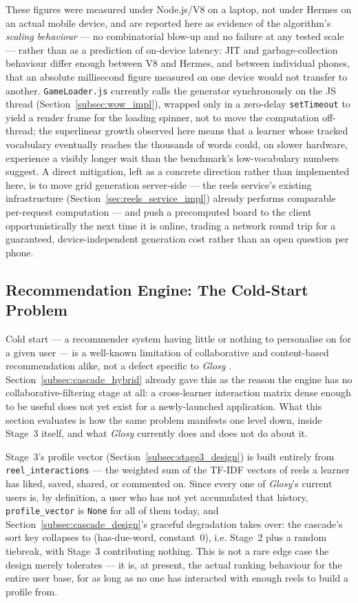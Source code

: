     These figures were measured under Node.js/V8 on a laptop, not under Hermes on an actual mobile device, and are reported here as evidence of the algorithm's \emph{scaling behaviour} --- no combinatorial blow-up and no failure at any tested scale --- rather than as a prediction of on-device latency: JIT and garbage-collection behaviour differ enough between V8 and Hermes, and between individual phones, that an absolute millisecond figure measured on one device would not transfer to another. \texttt{GameLoader.js} currently calls the generator synchronously on the JS thread (Section~\ref{subsec:wow_impl}), wrapped only in a zero-delay \texttt{setTimeout} to yield a render frame for the loading spinner, not to move the computation off-thread; the superlinear growth observed here means that a learner whose tracked vocabulary eventually reaches the thousands of words could, on slower hardware, experience a visibly longer wait than the benchmark's low-vocabulary numbers suggest. A direct mitigation, left as a concrete direction rather than implemented here, is to move grid generation server-side --- the reels service's existing infrastructure (Section~\ref{sec:reels_service_impl}) already performs comparable per-request computation --- and push a precomputed board to the client opportunistically the next time it is online, trading a network round trip for a guaranteed, device-independent generation cost rather than an open question per phone.

    \subsection{Recommendation Engine: The Cold-Start Problem}
    \label{subsec:recommender_cold_start}
    Cold start --- a recommender system having little or nothing to personalise on for a given user --- is a well-known limitation of collaborative and content-based recommendation alike, not a defect specific to \textit{Glosy} \cite{adomavicius2005toward}. Section~\ref{subsec:cascade_hybrid} already gave this as the reason the engine has no collaborative-filtering stage at all: a cross-learner interaction matrix dense enough to be useful does not yet exist for a newly-launched application. What this section evaluates is how the same problem manifests one level down, inside Stage~3 itself, and what \textit{Glosy} currently does and does not do about it.

    Stage~3's profile vector (Section~\ref{subsec:stage3_design}) is built entirely from \texttt{reel\_interactions} --- the weighted sum of the TF-IDF vectors of reels a learner has liked, saved, shared, or commented on. Since every one of \textit{Glosy}'s current users is, by definition, a user who has not yet accumulated that history, \texttt{profile\_vector} is \texttt{None} for all of them today, and Section~\ref{subsec:cascade_design}'s graceful degradation takes over: the cascade's sort key collapses to (has-due-word, constant~0), i.e. Stage~2 plus a random tiebreak, with Stage~3 contributing nothing. This is not a rare edge case the design merely tolerates --- it is, at present, the actual ranking behaviour for the entire user base, for as long as no one has interacted with enough reels to build a profile from.

